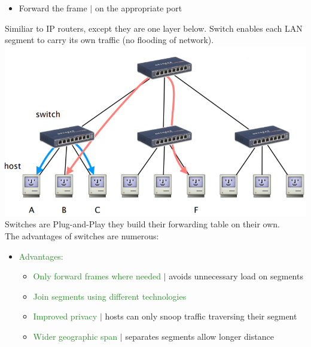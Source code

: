\documentclass[a4paper, fontsize=8pt, landscape, DIV=1]{scrartcl}
\begin{document}
\begin{multicols*}{4}
\begin{itemize}[noitemsep]
   				\item Forward the frame $\vert$ on the appropriate port
   			\end{itemize}
   			Similiar to IP routers, except they are one layer below. Switch enables each LAN segment to carry its own traffic (no flooding of network). 
   			\includegraphics[width=\columnwidth]{images/Link_Layer/switch_network.png}
   			Switches are Plug-and-Play they build their forwarding table on their own.\\
   			The advantages of switches are numerous: 
   			\begin{itemize}[noitemsep]
   				\item \textcolor{ForestGreen}{Advantages:}
   				\begin{itemize}
   					\item \textcolor{ForestGreen}{Only forward frames where needed} $\vert$ avoids unnecessary load on segments
   					\item \textcolor{ForestGreen}{Join segments using different technologies}
   					\item \textcolor{ForestGreen}{Improved privacy} $\vert$ hosts can only snoop traffic traversing their segment
   					\item \textcolor{ForestGreen}{Wider geographic span} $\vert$ separates segments allow longer distance
   				\end{itemize} 
   			\end{itemize}
   			\newpage
   			

\end{multicols*}
\end{document}
